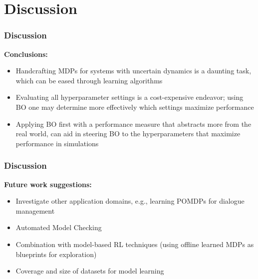 \section{Discussion}

\begin{frame}
\frametitle{Discussion}

\textbf{\textcolor{tudblue}{Conclusions:}}
\begin{itemize}
	\item Handcrafting MDPs for systems with uncertain dynamics is a daunting task, which can be eased through learning algorithms
	\item Evaluating all hyperparameter settings is a cost-expensive endeavor; using BO one may determine more effectively which settings maximize performance
	\item Applying BO first with a performance measure that abstracts more from the real world, can aid in steering BO to the hyperparameters that maximize performance in simulations
\end{itemize}


\end{frame}

\begin{frame}
	\frametitle{Discussion}
	
	\textbf{\textcolor{tudblue}{Future work suggestions:}}
	\begin{itemize}
		\item Investigate other application domains, e.g., learning POMDPs for dialogue management \cite{chinaei2011}
		\item Automated Model Checking \cite{lacerda2015optimal}
		\vspace{20pt}
		\item Combination with model-based RL techniques {(using offline learned MDPs as blueprints for exploration)}
		\item Coverage and size of datasets for model learning
	\end{itemize}
\end{frame}